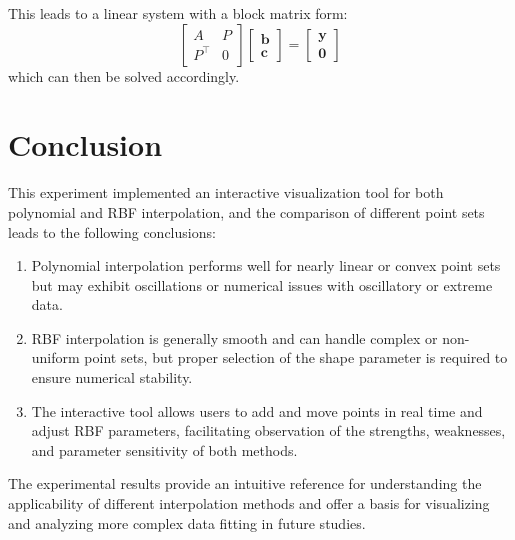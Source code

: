 \documentclass[12pt,a4paper]{report}
\begin{document}
        This leads to a linear system with a block matrix form:
        \begin{equation*}
            \begin{bmatrix}
                A & P \\
                P^{\top} & 0
            \end{bmatrix}
            \begin{bmatrix}
                \mathbf b \\
                \mathbf c
            \end{bmatrix}
            =
            \begin{bmatrix}
                \mathbf y \\
                \mathbf 0
            \end{bmatrix}
        \end{equation*}
        which can then be solved accordingly.


    \chapter{Conclusion}
        This experiment implemented an interactive visualization tool for both polynomial and RBF interpolation, and the comparison of different point sets leads to the following conclusions:

        \begin{enumerate}
            \item Polynomial interpolation performs well for nearly linear or convex point sets but may exhibit oscillations or numerical issues with oscillatory or extreme data.
            \item RBF interpolation is generally smooth and can handle complex or non-uniform point sets, but proper selection of the shape parameter is required to ensure numerical stability.
            \item The interactive tool allows users to add and move points in real time and adjust RBF parameters, facilitating observation of the strengths, weaknesses, and parameter sensitivity of both methods.
        \end{enumerate}

        The experimental results provide an intuitive reference for understanding the applicability of different interpolation methods and offer a basis for visualizing and analyzing more complex data fitting in future studies.
\end{document}
